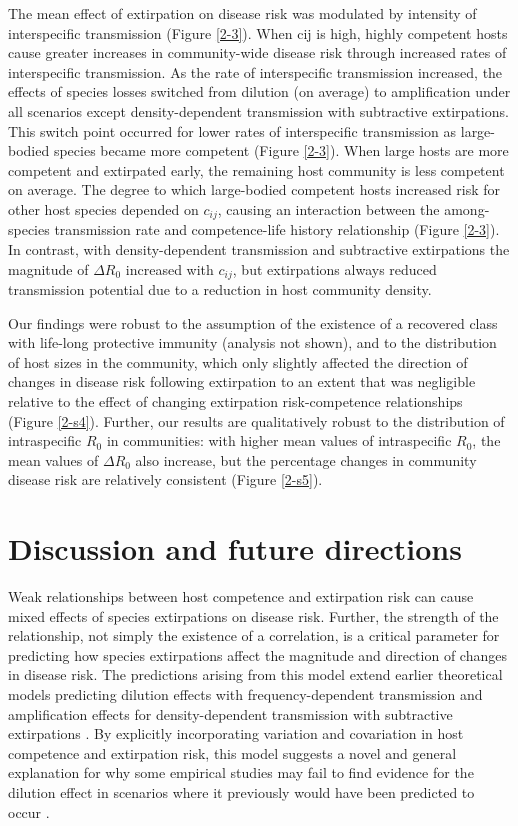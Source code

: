 The mean effect of extirpation on disease risk was modulated by intensity of interspecific transmission (Figure \ref{2-3}).
When cij is high, highly competent hosts cause greater increases in community-wide disease risk through increased rates of interspecific transmission.
As the rate of interspecific transmission increased, the effects of species losses switched from dilution (on average) to amplification under all scenarios except density-dependent transmission with subtractive extirpations.
This switch point occurred for lower rates of interspecific transmission as large-bodied species became more competent (Figure \ref{2-3}).
When large hosts are more competent and extirpated early, the remaining host community is less competent on average.
The degree to which large-bodied competent hosts increased risk for other host species depended on $c_{ij}$, causing an interaction between the among-species transmission rate and competence-life history relationship (Figure \ref{2-3}).
In contrast, with density-dependent transmission and subtractive extirpations the magnitude of $\Delta R_0$ increased with $c_{ij}$, but extirpations always reduced transmission potential due to a reduction in host community density.

Our findings were robust to the assumption of the existence of a recovered class with life-long protective immunity (analysis not shown), and to the distribution of host sizes in the community, which only slightly affected the direction of changes in disease risk following extirpation to an extent that was negligible relative to the effect of changing extirpation risk-competence relationships (Figure \ref{2-s4}).
Further, our results are qualitatively robust to the distribution of intraspecific $R_0$ in communities: with higher mean values of intraspecific $R_0$, the mean values of $\Delta R_0$ also increase, but the percentage changes in community disease risk are relatively consistent (Figure \ref{2-s5}).

\section{Discussion and future directions}

Weak relationships between host competence and extirpation risk can cause mixed effects of species extirpations on disease risk.
Further, the strength of the relationship, not simply the existence of a correlation, is a critical parameter for predicting how species extirpations affect the magnitude and direction of changes in disease risk.
The predictions arising from this model extend earlier theoretical models predicting dilution effects with frequency-dependent transmission and amplification effects for density-dependent transmission with subtractive extirpations \citep{Dobson2004, Rudolf2005, Ostfeld2012}.
By explicitly incorporating variation and covariation in host competence and extirpation risk, this model suggests a novel and general explanation for why some empirical studies may fail to find evidence for the dilution effect in scenarios where it previously would have been predicted to occur \citep{Randolph2012, Wood2012, Salkeld2013}.

